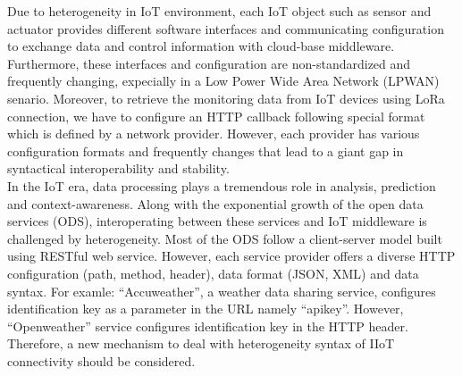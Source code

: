 Due to heterogeneity in IoT environment, each IoT object such as sensor and actuator provides different software interfaces and communicating configuration to exchange data and control information with cloud-base middleware. Furthermore, these interfaces and configuration are non-standardized and frequently changing, expecially in a Low Power Wide Area Network (LPWAN) senario. Moreover, to retrieve the monitoring data from IoT devices using LoRa  connection, we have to configure an HTTP callback following special format which is defined by a network provider. However, each provider has various configuration formats and frequently changes that lead to a giant gap in syntactical interoperability and stability.\\

In the IoT era, data processing plays a tremendous role in analysis, prediction and context-awareness. Along with the exponential growth of the open data services (ODS), interoperating between these services and IoT middleware is challenged by heterogeneity. Most of the ODS follow a client-server model built using RESTful web service. However, each service provider offers a diverse HTTP configuration (path, method, header), data format (JSON, XML) and data syntax. For examle: “Accuweather”, a weather data sharing service, configures identification key as a parameter in the URL namely “apikey”. However, “Openweather” service configures identification key in the HTTP header. Therefore, a new mechanism to deal with heterogeneity syntax of IIoT connectivity should be considered.\\

